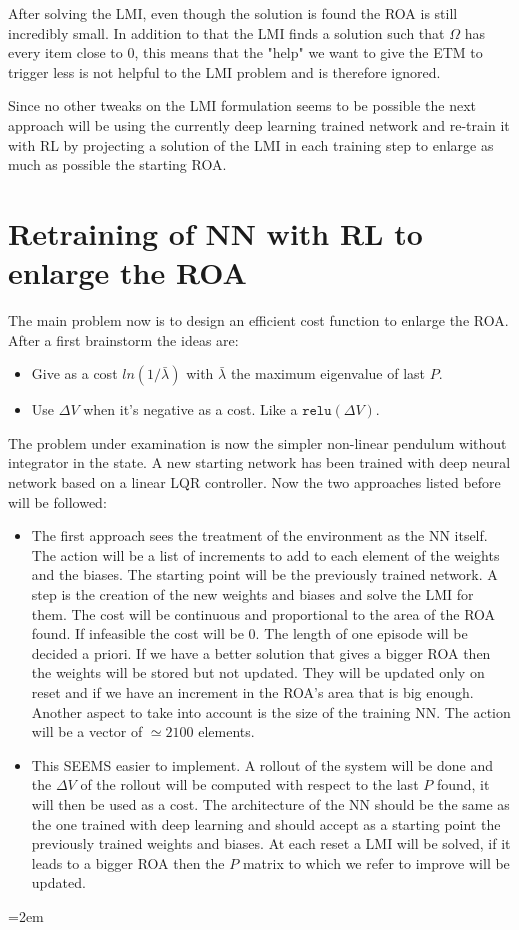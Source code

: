 \documentclass{article}
\begin{document}
After solving the LMI, even though the solution is found the ROA is still incredibly small. In addition to that the LMI finds a solution such that $\Omega$ has every item close to 0, this means that the "help" we want to give the ETM to trigger less is not helpful to the LMI problem and is therefore ignored. 

Since no other tweaks on the LMI formulation seems to be possible the next approach will be using the currently deep learning trained network and re-train it with RL by projecting a solution of the LMI in each training step to enlarge as much as possible the starting ROA. 

\section*{Retraining of NN with RL to enlarge the ROA}
The main problem now is to design an efficient cost function to enlarge the ROA. After a first brainstorm the ideas are:
\begin{itemize}
  \item Give as a cost $ln(1/\bar{\lambda})$ with $\bar{\lambda}$ the maximum eigenvalue of last $P$. 
  \item Use $\Delta V$ when it's negative as a cost. Like a $\texttt{relu}(\Delta V)$.
\end{itemize}

The problem under examination is now the simpler non-linear pendulum without integrator in the state. A new starting network has been trained with deep neural network based on a linear LQR controller. Now the two approaches listed before will be followed:

\begin{itemize}
  \item The first approach sees the treatment of the environment as the NN itself. The action will be a list of increments to add to each element of the weights and the biases. The starting point will be the previously trained network. A step is the creation of the new weights and biases and solve the LMI for them. The cost will be continuous and proportional to the area of the ROA found. If infeasible the cost will be $0$. The length of one episode will be decided a priori. If we have a better solution that gives a bigger ROA then the weights will be stored but not updated. They will be updated only on reset and if we have an increment in the ROA's area that is big enough. Another aspect to take into account is the size of the training NN. The action will be a vector of $\simeq 2100$ elements.
  \item This SEEMS easier to implement. A rollout of the system will be done and the $\Delta V$ of the rollout will be computed with respect to the last $P$ found, it will then be used as a cost. The architecture of the NN should be the same as the one trained with deep learning and should accept as a starting point the previously trained weights and biases. At each reset a LMI will be solved, if it leads to a bigger ROA then the $P$ matrix to which we refer to improve will be updated.
\end{itemize}



\pagebreak
\emergencystretch=2em %
\printbibliography
\end{document}
